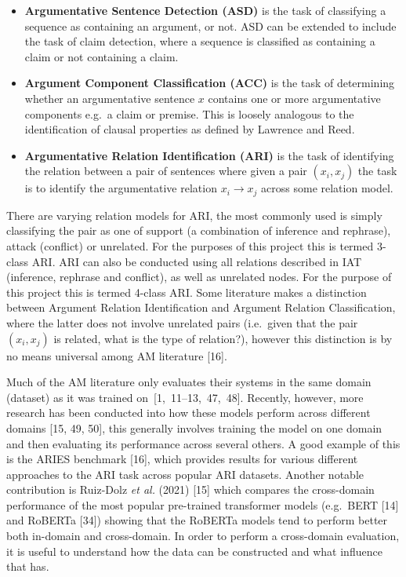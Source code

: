 \documentclass[twocolumn]{article}
\providecommand{\tightlist}{%
  \setlength{\itemsep}{0pt}\setlength{\parskip}{0pt}}
\begin{document}
\begin{itemize}
\tightlist
\item
  \textbf{Argumentative Sentence Detection (ASD)} is the task of
  classifying a sequence as containing an argument, or not. ASD can be
  extended to include the task of claim detection, where a sequence is
  classified as containing a claim or not containing a claim.
\item
  \textbf{Argument Component Classification (ACC)} is the task of
  determining whether an argumentative sentence \(x\) contains one or
  more argumentative components e.g.~a claim or premise. This is loosely
  analogous to the identification of clausal properties as defined by
  Lawrence and Reed.
\item
  \textbf{Argumentative Relation Identification (ARI)} is the task of
  identifying the relation between a pair of sentences where given a
  pair \((x_i, x_j)\) the task is to identify the argumentative relation
  \(x_i \rightarrow x_j\) across some relation model.
\end{itemize}

There are varying relation models for ARI, the most commonly used is
simply classifying the pair as one of support (a combination of
inference and rephrase), attack (conflict) or unrelated. For the
purposes of this project this is termed 3-class ARI. ARI can also be
conducted using all relations described in IAT (inference, rephrase and
conflict), as well as unrelated nodes. For the purpose of this project
this is termed 4-class ARI. Some literature makes a distinction between
Argument Relation Identification and Argument Relation Classification,
where the latter does not involve unrelated pairs (i.e.~given that the
pair \((x_i, x_j)\) is related, what is the type of relation?), however
this distinction is by no means universal among AM literature {[}16{]}.

Much of the AM literature only evaluates their systems in the same
domain (dataset) as it was trained \mbox{on {[}1, 11--13, 47, 48{]}.} Recently, however, more research has been conducted
into how these models perform across different domains {[}15, 49, 50{]}, this generally involves training the model on one
domain and then evaluating its performance across several others. A good
example of this is the ARIES benchmark {[}16{]}, which provides results
for various different approaches to the ARI task across popular ARI
datasets. Another notable contribution is Ruiz-Dolz \emph{et al.} (2021)
{[}15{]} which compares the cross-domain performance of the most popular
pre-trained transformer models (e.g.~BERT {[}14{]} and RoBERTa {[}34{]})
showing that the RoBERTa models tend to perform better both in-domain
and cross-domain. In order to perform a cross-domain evaluation, it is
useful to understand how the data can be constructed and what influence
that has.
\end{document}
